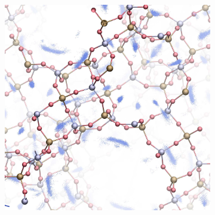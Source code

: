 \documentclass[thesis]{subfiles}
\begin{document}
\begin{otherlanguage}{french}
\begin{figure}[ht]
\begin{subfigure}{0.45\columnwidth}
		\includegraphics[width=0.95\columnwidth]{figures/cations/FAU1_density.jpg}
	\end{subfigure}\hfill
	
	\vspace{0.5em}
	

\end{figure}
\end{otherlanguage}
\end{document}

